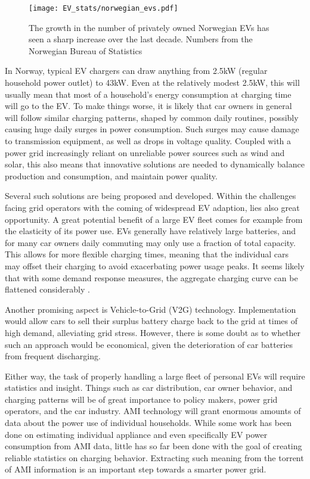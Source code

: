 \documentclass[12pt, american]{article}
\begin{document}
\begin{figure}[h]
\centering
\def\svgwidth{\columnwidth}
\caption{The growth in the number of privately owned Norwegian EVs has seen a sharp increase over the last decade. Numbers from the Norwegian Bureau of Statistics}
\texttt{[image: EV\_stats/norwegian\_evs.pdf]}
\label{fig:norwegian_evs}
\end{figure}

In Norway, typical EV chargers can draw anything from 2.5kW (regular household power outlet) to 43kW. Even at the relatively modest 2.5kW, this will usually mean that most of a household's energy consumption at charging time will go to the EV. To make things worse, it is likely that car owners in general will follow similar charging patterns, shaped by common daily routines, possibly causing huge daily surges in power consumption. Such surges may cause damage to transmission equipment, as well as drops in voltage quality. Coupled with a power grid increasingly reliant on unreliable power sources such as wind and solar, this also means that innovative solutions are needed to dynamically balance production and consumption, and maintain power quality.

Several such solutions are being proposed and developed. Within the challenges facing grid operators with the coming of widespread EV adaption, lies also great opportunity. A great potential benefit of a large EV fleet comes for example from the elasticity of its power use. EVs generally have relatively large batteries, and for many car owners daily commuting may only use a fraction of total capacity. This allows for more flexible charging times, meaning that the individual cars may offset their charging to avoid exacerbating power usage peaks. It seems likely that with some demand response measures, the aggregate charging curve can be flattened considerably \cite{Babrowski2014}.

Another promising aspect is Vehicle-to-Grid (V2G) technology. Implementation would allow cars to sell their surplus battery charge back to the grid at times of high demand, alleviating grid stress. However, there is some doubt as to whether such an approach would be economical, given the deterioration of car batteries from frequent discharging\cite{Mullan2012a}.

Either way, the task of properly handling a large fleet of personal EVs will require statistics and insight. Things such as car distribution, car owner behavior, and charging patterns will be of great importance to policy makers, power grid operators, and the car industry. AMI technology will grant enormous amounts of data about the power use of individual households. While some work has been done on estimating individual appliance and even specifically EV power consumption from AMI data, little has so far been done with the goal of creating reliable statistics on charging behavior. Extracting such meaning from the torrent of AMI information is an important step towards a smarter power grid.
\end{document}
